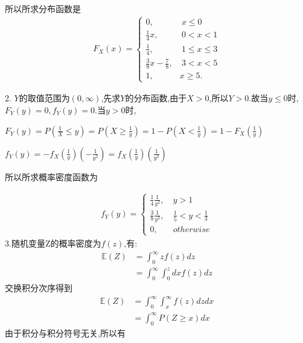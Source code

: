 \documentclass[answers]{exam}  %
\begin{document}
\begin{questions}
\begin{solution}
        所以所求分布函数是
        \begin{align*}
            F_X(x)=
            \begin{cases}
                0,                         & \ x\leq 0         \\
                \frac{1}{4} x ,            & \ 0< x< 1         \\
                \frac{1}{4},               & \ 1\leq  x\leq 3  \\
                \frac{3}{8} x-\frac{7}{8}, & \ 3<x<5           \\
                1,                         & \text{} x\geq 5 .
            \end{cases}
        \end{align*}

        2.
        $Y$的取值范围为$(0,\infty)$,先求$Y$的分布函数,由于$X>0$,所以$Y>0$.故当$y\leq 0$时,$F_Y(y)=0,f_Y(y)=0.$当$y>0$时,

        $F_Y(y)=P(\frac{1}{X}\leq y )=P(X\geq \frac{1}{y} )=1-P(X< \frac{1}{y} )=1-F_X(\frac{1}{y} )$

        $f_Y(y)=-f_X(\frac{1}{y} )(-\frac{1}{y^2} )=f_X(\frac{1}{y} )(\frac{1}{y^2} )$

        所以所求概率密度函数为

        \begin{align*}
            f_Y(y)=
            \begin{cases}
                \frac{1}{4} \frac{1}{y^2} , & \ y>1                        \\
                \frac{3}{8} \frac{1}{y^2} , & \ \frac{1}{5} <y<\frac{1}{3} \\
                0,                          & \ otherwise
            \end{cases}
        \end{align*}
        3.随机变量Z的概率密度为$f(z)$,有:
        \begin{align*}
            \mathbb E(Z) & =\int_0^\infty zf(z)dz          \\
                         & =\int_0^\infty\int_0^z dxf(z)dz
        \end{align*}
        交换积分次序得到
        \begin{align*}
            \mathbb E(Z) & =\int_0^\infty\int_x^\infty f(z)dzdx \\
                         & =\int_0^\infty P(Z\geq x)dx
        \end{align*}
        由于积分与积分符号无关,所以有


\end{solution}
\end{questions}
\end{document}
